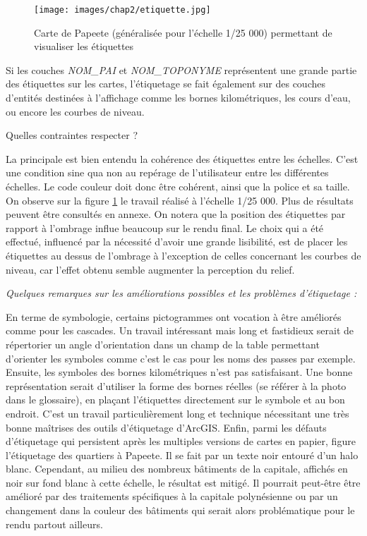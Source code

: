 \begin{figure}[ht]
\centering
\texttt{[image: images/chap2/etiquette.jpg]}
\caption{Carte de Papeete (généralisée pour l'échelle 1/25 000) permettant de visualiser les étiquettes}
\label{25eti}
\end{figure}

Si les couches \textit{NOM\_PAI} et \textit{NOM\_TOPONYME} représentent une grande partie des étiquettes sur les cartes, l'étiquetage se fait également sur des couches d'entités destinées à l'affichage comme les bornes kilométriques, les cours d'eau, ou encore les courbes de niveau.

\begin{center}
    Quelles contraintes respecter ?
\end{center}

La principale est bien entendu la cohérence des étiquettes entre les échelles. C'est une condition sine qua non au repérage de l'utilisateur entre les différentes échelles. Le code couleur doit donc être cohérent, ainsi que la police et sa taille. On observe sur la figure \ref{25eti} le travail réalisé à l'échelle 1/25 000. Plus de résultats peuvent être consultés en annexe.
On notera que la position des étiquettes par rapport à l'ombrage influe beaucoup sur le rendu final. Le choix qui a été effectué, influencé par la nécessité d'avoir une grande lisibilité, est de placer les étiquettes au dessus de l'ombrage à l'exception de celles concernant les courbes de niveau, car l'effet obtenu semble augmenter la perception du relief.

\begin{center}
    \textit{Quelques remarques sur les améliorations possibles et les problèmes d'étiquetage :}
\end{center}

En terme de symbologie, certains pictogrammes ont vocation à être améliorés comme pour les cascades. Un travail intéressant mais long et fastidieux serait de répertorier un angle d'orientation dans un champ de la table permettant d'orienter les symboles comme c'est le cas pour les noms des passes par exemple. Ensuite, les symboles des bornes kilométriques n'est pas satisfaisant. Une bonne représentation serait d'utiliser la forme des bornes réelles (se référer à la photo dans le glossaire), en plaçant l'étiquettes directement sur le symbole et au bon endroit. C'est un travail particulièrement long et technique nécessitant une très bonne maîtrises des outils d'étiquetage d'ArcGIS. Enfin, parmi les défauts d'étiquetage qui persistent après les multiples versions de cartes en papier, figure l'étiquetage des quartiers à Papeete. Il se fait par un texte noir entouré d'un halo blanc. Cependant, au milieu des nombreux bâtiments de la capitale, affichés en noir sur fond blanc à cette échelle, le résultat est mitigé. Il pourrait peut-être être amélioré par des traitements spécifiques à la capitale polynésienne ou par un changement dans la couleur des bâtiments qui serait alors problématique pour le rendu partout ailleurs.




